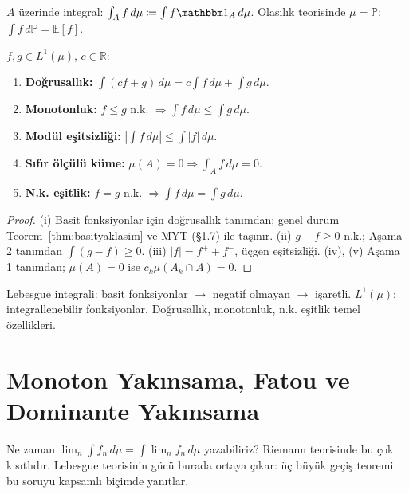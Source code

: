 \begin{notkutu}
$A$ üzerinde integral: $\int_A f \, d\mu \coloneqq \int f \gostf{A} \, d\mu$.
Olasılık teorisinde $\mu = \mathbb{P}$: $\int f \, d\mathbb{P} = \mathbb{E}[f]$.
\end{notkutu}

\begin{teorem}\label{thm:lebesgueozell}
$f, g \in L^1(\mu)$, $c \in \mathbb{R}$:
\begin{enumerate}[label=(\roman*)]
  \item \textbf{Doğrusallık:} $\int (cf + g) \, d\mu = c \int f \, d\mu + \int g \, d\mu$.
  \item \textbf{Monotonluk:} $f \leq g$ n.k. $\Rightarrow \int f \, d\mu \leq \int g \, d\mu$.
  \item \textbf{Modül eşitsizliği:} $\left|\int f \, d\mu\right| \leq \int |f| \, d\mu$.
  \item \textbf{Sıfır ölçülü küme:} $\mu(A) = 0 \Rightarrow \int_A f \, d\mu = 0$.
  \item \textbf{N.k. eşitlik:} $f = g$ n.k. $\Rightarrow \int f \, d\mu = \int g \, d\mu$.
\end{enumerate}
\end{teorem}

\begin{proof}
(i) Basit fonksiyonlar için doğrusallık tanımdan; genel durum Teorem~\ref{thm:basityaklasim}
ve MYT (§1.7) ile taşınır.
(ii) $g - f \geq 0$ n.k.; Aşama 2 tanımdan $\int(g-f) \geq 0$.
(iii) $|f| = f^+ + f^-$, üçgen eşitsizliği.
(iv), (v) Aşama 1 tanımdan; $\mu(A) = 0$ ise $c_k \mu(A_k \cap A) = 0$.
\end{proof}

\begin{mikroozet}[§1.6 özeti]
Lebesgue integrali: basit fonksiyonlar $\to$ negatif olmayan $\to$ işaretli.
$L^1(\mu)$: integrallenebilir fonksiyonlar. Doğrusallık, monotonluk, n.k.
eşitlik temel özellikleri.
\end{mikroozet}


\section{Monoton Yakınsama, Fatou ve Dominante Yakınsama}

\begin{motivasyon}[§1.7]
Ne zaman $\lim_n \int f_n \, d\mu = \int \lim_n f_n \, d\mu$ yazabiliriz?
Riemann teorisinde bu çok kısıtlıdır. Lebesgue teorisinin gücü burada ortaya
çıkar: üç büyük geçiş teoremi bu soruyu kapsamlı biçimde yanıtlar.
\end{motivasyon}

